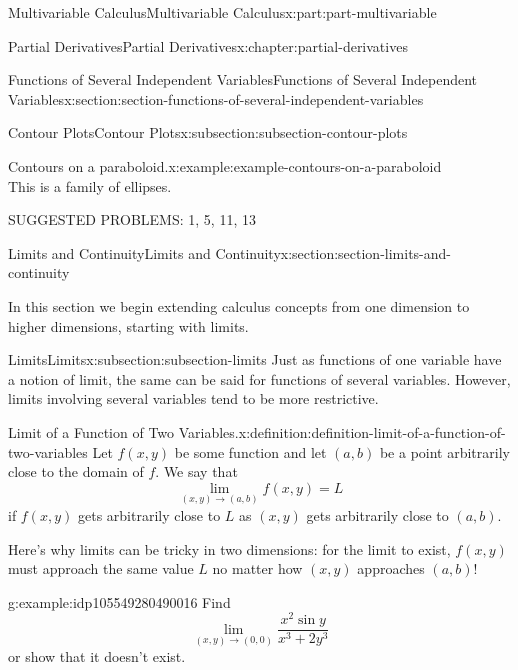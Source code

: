 \documentclass[twoside,10pt,]{book}
\numberwithin{equation}{part}
\begin{document}
\begin{partptx}{Multivariable Calculus}{}{Multivariable Calculus}{}{}{x:part:part-multivariable}
\begin{chapterptx}{Partial Derivatives}{}{Partial Derivatives}{}{}{x:chapter:partial-derivatives}
\begin{sectionptx}{Functions of Several Independent Variables}{}{Functions of Several Independent Variables}{}{}{x:section:section-functions-of-several-independent-variables}
\begin{subsectionptx}{Contour Plots}{}{Contour Plots}{}{}{x:subsection:subsection-contour-plots}
\begin{example}{Contours on a paraboloid.}{x:example:example-contours-on-a-paraboloid}
\begin{equation*}
\end{equation*}
This is a family of ellipses.%
\end{example}
\end{subsectionptx}
\begin{conclusion}{}%
SUGGESTED PROBLEMS: 1, 5, 11, 13%
\end{conclusion}%
\end{sectionptx}
%
%
\typeout{************************************************}
\typeout{************************************************}
%
\begin{sectionptx}{Limits and Continuity}{}{Limits and Continuity}{}{}{x:section:section-limits-and-continuity}
\begin{introduction}{}%
In this section we begin extending calculus concepts from one dimension to higher dimensions, starting with limits.%
\end{introduction}%
%
%
\typeout{************************************************}
\typeout{************************************************}
%
\begin{subsectionptx}{Limits}{}{Limits}{}{}{x:subsection:subsection-limits}
Just as functions of one variable have a notion of limit, the same can be said for functions of several variables. However, limits involving several variables tend to be more restrictive.%
\begin{definition}{Limit of a Function of Two Variables.}{x:definition:definition-limit-of-a-function-of-two-variables}%
%
Let \(f(x,y)\) be some function and let \((a,b)\) be a point arbitrarily close to the domain of \(f\). We say that%
\begin{equation*}
\lim_{(x,y)\to(a,b)}f(x,y) = L
\end{equation*}
if \(f(x,y)\) gets arbitrarily close to \(L\) as \((x,y)\) gets arbitrarily close to \((a,b)\).%
\end{definition}
Here's why limits can be tricky in two dimensions: for the limit to exist, \(f(x,y)\) must approach the same value \(L\) no matter how \((x,y)\) approaches \((a,b)\)!%
\begin{example}{}{g:example:idp105549280490016}%
Find%
\begin{equation*}
\lim_{(x,y)\to(0,0)}\frac{x^{2}\sin y}{x^{3}+2y^{3}}
\end{equation*}
or show that it doesn't exist.%
\par\smallskip%

\end{example}
\end{subsectionptx}
\end{sectionptx}
\end{chapterptx}
\end{partptx}
\end{document}
